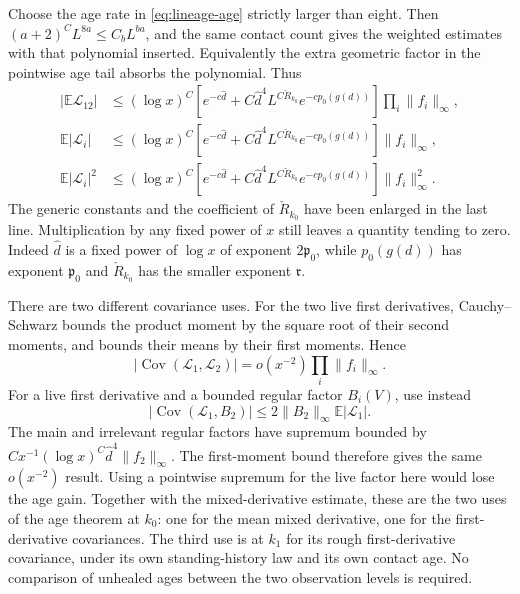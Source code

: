 \documentclass[11pt,letterpaper,reqno]{amsart}
\theoremstyle{definition}
\theoremstyle{remark}
\begin{document}
Choose the age rate in \eqref{eq:lineage-age} strictly larger than
eight. Then $(a+2)^CL^{8a}\le C_bL^{ba}$, and the same contact
count gives the weighted estimates with that polynomial inserted.
Equivalently the extra geometric factor in the pointwise age tail
absorbs the polynomial. Thus
\begin{align*}
 |\mathbb E\mathcal L_{12}|
 &\le(\log x)^C
       [e^{-c\hat d}+C\hat d^4L^{C\check R_{k_0}}
                                       e^{-cp_0(g(d))}]
                                      \prod_i\|f_i\|_\infty,\\
 \mathbb E|\mathcal L_i|
 &\le(\log x)^C
       [e^{-c\hat d}+C\hat d^4L^{C\check R_{k_0}}
                                       e^{-cp_0(g(d))}]
                                                   \|f_i\|_\infty,\\
 \mathbb E|\mathcal L_i|^2
 &\le(\log x)^C
       [e^{-c\hat d}+C\hat d^4L^{C\check R_{k_0}}
                                       e^{-cp_0(g(d))}]
                                                 \|f_i\|_\infty^2.
\end{align*}
The generic constants and the coefficient of $\check R_{k_0}$ have
been enlarged in the last line. Multiplication by any fixed power of
$x$ still leaves a quantity tending to zero. Indeed
$\hat d$ is a fixed power of $\log x$ of exponent
$2\mathfrak p_0$, while $p_0(g(d))$ has exponent
$\mathfrak p_0$ and $\check R_{k_0}$ has the smaller exponent $\mathfrak r$.

There are two different covariance uses. For the two live first
derivatives, Cauchy--Schwarz bounds the product moment by the square
root of their second moments, and bounds their means by their first
moments. Hence
\[
 |\operatorname{Cov}(\mathcal L_1,\mathcal L_2)|
                         =o(x^{-2})\prod_i\|f_i\|_\infty.
\]
For a live first derivative and a bounded regular factor $B_i(V)$,
use instead
\[
 |\operatorname{Cov}(\mathcal L_1,B_2)|
                          \le2\|B_2\|_\infty\mathbb E|\mathcal L_1|.
\]
The main and irrelevant regular factors have supremum bounded by
$Cx^{-1}(\log x)^C\hat d^4\|f_2\|_\infty$.
The first-moment bound therefore gives the same $o(x^{-2})$ result.
Using a pointwise supremum for the live factor here would lose the
age gain. Together with the mixed-derivative estimate, these are the
two uses of the age theorem at $k_0$: one for the mean mixed
derivative, one for the first-derivative covariances. The third use is
at $k_1$ for its rough first-derivative covariance, under its own
standing-history law and its own contact age. No comparison of
unhealed ages between the two observation levels is required.
\end{document}
